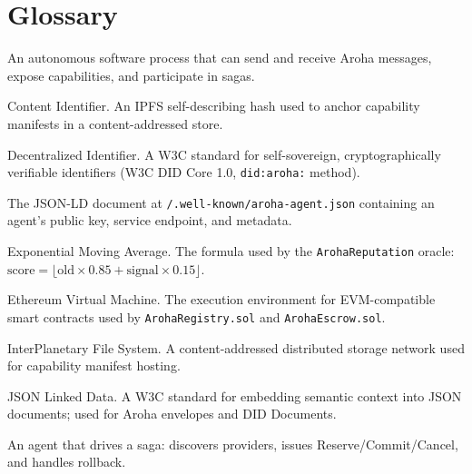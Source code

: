 \documentclass[11pt,a4paper]{article}
\begin{document}
\section{Glossary}

\begin{description}[labelwidth=5cm, leftmargin=!, font=\ttfamily]
  \item[Agent]           An autonomous software process that can send and receive
                         Aroha messages, expose capabilities, and participate in sagas.
  \item[CID]             Content Identifier. An IPFS self-describing hash used to
                         anchor capability manifests in a content-addressed store.
  \item[DID]             Decentralized Identifier. A W3C standard for
                         self-sovereign, cryptographically verifiable identifiers
                         (W3C DID Core 1.0, \texttt{did:aroha:} method).
  \item[DID Document]    The JSON-LD document at
                         \texttt{/.well-known/aroha-agent.json} containing an
                         agent's public key, service endpoint, and metadata.
  \item[EMA]             Exponential Moving Average. The formula used by the
                         \texttt{ArohaReputation} oracle:
                         $\text{score} = \lfloor\text{old} \times 0.85 +
                         \text{signal} \times 0.15\rfloor$.
  \item[EVM]             Ethereum Virtual Machine. The execution environment for
                         EVM-compatible smart contracts used by
                         \texttt{ArohaRegistry.sol} and \texttt{ArohaEscrow.sol}.
  \item[IPFS]            InterPlanetary File System. A content-addressed
                         distributed storage network used for capability manifest
                         hosting.
  \item[JSON-LD]         JSON Linked Data. A W3C standard for embedding semantic
                         context into JSON documents; used for Aroha envelopes and
                         DID Documents.
  \item[Orchestrator]    An agent that drives a saga: discovers providers,
                         issues Reserve/Commit/Cancel, and handles rollback.

\end{description}
\end{document}
